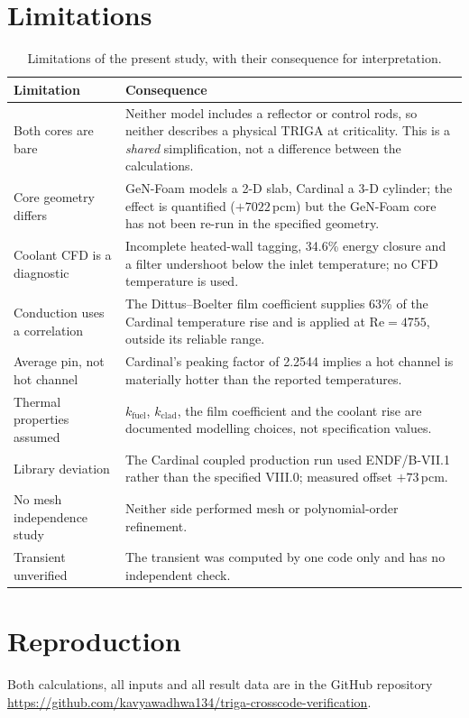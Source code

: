 \documentclass[11pt,a4paper]{article}
\newcommand{\pcm}{\,pcm}
\begin{document}
\section{Limitations}
\begin{table}[H]\centering\small
\caption{Limitations of the present study, with their consequence for interpretation.}
\begin{tabular}{@{}p{48mm}p{88mm}@{}}
\toprule
\textbf{Limitation} & \textbf{Consequence}\\
\midrule
Both cores are bare & Neither model includes a reflector or control rods, so neither
describes a physical TRIGA at criticality. This is a \emph{shared} simplification, not a
difference between the calculations.\\
Core geometry differs & GeN-Foam models a 2-D slab, Cardinal a 3-D cylinder; the effect is
quantified ($+7022$\pcm) but the GeN-Foam core has not been re-run in the specified geometry.\\
Coolant CFD is a diagnostic & Incomplete heated-wall tagging, 34.6\% energy closure and a
filter undershoot below the inlet temperature; no CFD temperature is used.\\
Conduction uses a correlation & The Dittus--Boelter film coefficient supplies 63\% of the
Cardinal temperature rise and is applied at $\mathrm{Re}=4755$, outside its reliable range.\\
Average pin, not hot channel & Cardinal's peaking factor of 2.2544 implies a hot channel is
materially hotter than the reported temperatures.\\
Thermal properties assumed & $k_{\text{fuel}}$, $k_{\text{clad}}$, the film coefficient and
the coolant rise are documented modelling choices, not specification values.\\
Library deviation & The Cardinal coupled production run used ENDF/B-VII.1 rather than the
specified VIII.0; measured offset $+73$\pcm.\\
No mesh independence study & Neither side performed mesh or polynomial-order refinement.\\
Transient unverified & The transient was computed by one code only and has no independent
check.\\
\bottomrule
\end{tabular}
\end{table}

\section{Reproduction}
Both calculations, all inputs and all result data are in the GitHub repository
\url{https://github.com/kavyawadhwa134/triga-crosscode-verification}.
\end{document}
